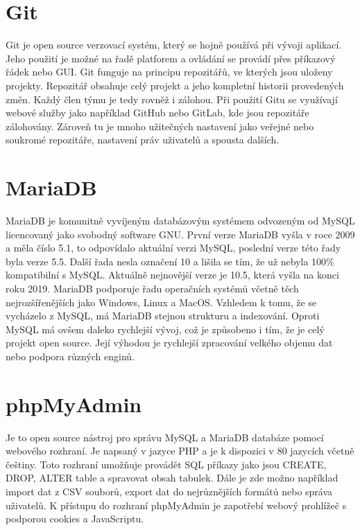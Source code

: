 \section{Git}

Git je open source verzovací systém, který se hojně používá při vývoji
aplikací. Jeho použití je možné na řadě platforem a ovládání
se provádí přes příkazový řádek nebo GUI. Git funguje na principu
repozitářů, ve kterých jsou uloženy projekty. Repozitář obsahuje celý
projekt a jeho kompletní historii provedených změn. Každý člen týmu je
tedy rovněž i zálohou. Při použití Gitu se využívají webové služby
jako například GitHub nebo GitLab, kde jsou repozitáře
zálohovány. Zároveň tu je mnoho užitečných nastavení jako veřejné nebo
soukromé repozitáře, nastavení práv uživatelů a spousta dalších.

\newpage

\section{MariaDB}

MariaDB je komunitně vyvíjeným databázovým systémem odvozeným od MySQL
licencovaný jako svobodný software GNU. První verze MariaDB vyšla v
roce 2009 a měla číslo 5.1, to odpovídalo aktuální verzi MySQL,
poslední verze této řady byla verze 5.5. Další řada nesla označení 10
a lišila se tím, že už nebyla 100\% kompatibilní s MySQL. Aktuálně
nejnovější verze je 10.5, která vyšla na konci roku 2019. MariaDB
podporuje řadu operačních systémů včetně těch nejrozšířenějších jako
Windows, Linux a MacOS. Vzhledem k tomu, že se vycházelo z MySQL, má
MariaDB stejnou strukturu a indexování. Oproti MySQL má ovšem daleko
rychlejší vývoj, což je způsobeno i tím, že je celý projekt open
source. Její výhodou je rychlejší zpracování velkého objemu dat nebo
podpora různých enginů.

\section{phpMyAdmin}

Je to open source nástroj pro správu MySQL a MariaDB databáze pomocí
webového rozhraní. Je napsaný v jazyce PHP a je k dispozici v 80
jazycích včetně češtiny. Toto rozhraní umožňuje provádět SQL příkazy
jako jsou CREATE, DROP, ALTER table a spravovat obsah tabulek. Dále je
zde možno například import dat z CSV souborů, export dat do
nejrůznějších formátů nebo správa uživatelů. K přístupu do rozhraní
phpMyAdmin je zapotřebí webový prohlížeč s podporou cookies a
JavaScriptu.




\textbf{}
\textit{}
